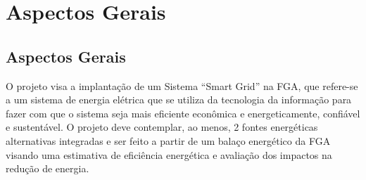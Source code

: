 \part{Aspectos Gerais}
\chapter[Aspectos Gerais]{Aspectos Gerais}

O projeto visa a implantação de um Sistema “Smart Grid” na FGA, que refere-se a um sistema de energia elétrica que se utiliza da tecnologia da informação para fazer com que o sistema seja mais eficiente econômica e energeticamente, confiável e sustentável. O projeto deve contemplar, ao menos, 2 fontes energéticas alternativas integradas e ser feito a partir de um balaço energético da FGA visando uma estimativa de eficiência energética e avaliação dos impactos na redução de energia.